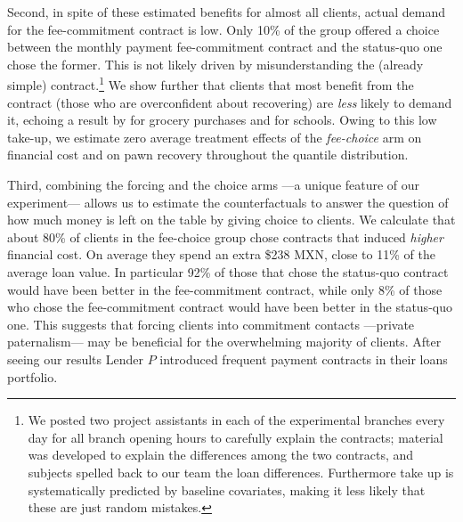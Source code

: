 \documentclass[oneside,11pt]{article}
\begin{document}
Second, in spite of these estimated benefits for almost all clients, actual demand for the fee-commitment contract is low. Only 10\% of the group offered a choice between the monthly payment fee-commitment contract and the status-quo one chose the former. This is not likely driven by misunderstanding the (already simple) contract.\footnote{We posted two project assistants in each of the experimental branches every day for all branch opening hours to carefully explain the contracts; material was developed to explain the differences among the two contracts, and subjects spelled back to our team the loan differences. Furthermore take up is systematically predicted by baseline covariates, making it less likely that these are just random mistakes.} We show further that clients that most benefit from the contract (those who are overconfident about recovering) are \textit{less} likely to demand it, echoing a result by \cite{Sprenger} for grocery purchases and \cite{Walters} for schools. %
Owing to this low take-up, we estimate zero average treatment effects of the \textit{fee-choice} arm on financial cost and on pawn recovery throughout the quantile distribution.


Third, combining the forcing and the choice arms ---a unique feature of our experiment--- allows us to estimate the counterfactuals to answer the question of how much money is left on the table by giving choice to clients. We calculate that about {80}\% of clients in the fee-choice group chose contracts that induced \textit{higher} financial cost. On average they spend an extra \${238} MXN, close to {11}\% of the average loan value. In particular {92}\% of those that chose the status-quo contract would have been better in the fee-commitment contract, while only {8}\% of those who chose the fee-commitment contract would have been better in the status-quo one. This suggests that forcing clients into commitment contacts ---private paternalism--- may be beneficial for the overwhelming majority of clients. After seeing our results Lender $P$ introduced frequent payment contracts in their loans portfolio.
\end{document}
